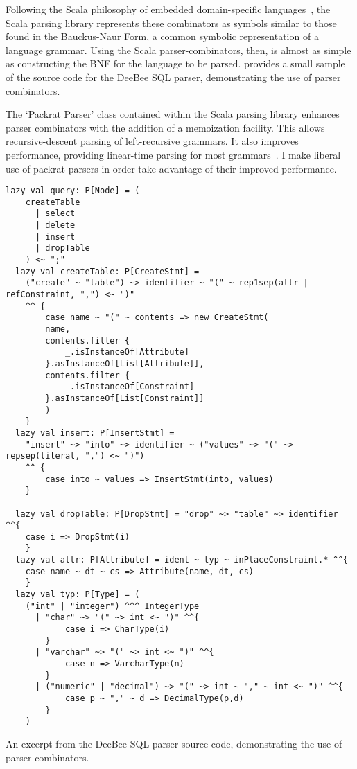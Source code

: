 Following the Scala philosophy of embedded domain-specific languages~\cite{ghosh2010dsls,hofer2008polymorphic,moors2008parser}, the Scala parsing library represents these combinators as symbols similar to those found in the Bauckus-Naur Form, a common symbolic representation of a language grammar. Using the Scala parser-combinators, then, is almost as simple as constructing the BNF for the language to be parsed.  provides a small sample of the source code for the DeeBee SQL parser, demonstrating the use of parser combinators. 

The `Packrat Parser' class contained within the Scala parsing library enhances parser combinators with the addition of a memoization facility. This allows recursive-descent parsing of left-recursive grammars. It also improves performance, providing linear-time parsing for most grammars~\cite{jonnalagedda2009packrat}. I make liberal use of packrat parsers in order take advantage of their improved performance.

\begin{listing}[H]
    \begin{verbatim}
lazy val query: P[Node] = (
    createTable
      | select
      | delete
      | insert
      | dropTable
    ) <~ ";"
  lazy val createTable: P[CreateStmt] = 
    ("create" ~ "table") ~> identifier ~ "(" ~ rep1sep(attr | refConstraint, ",") <~ ")" 
    ^^ {
        case name ~ "(" ~ contents => new CreateStmt(
        name,
        contents.filter {
            _.isInstanceOf[Attribute]
        }.asInstanceOf[List[Attribute]],
        contents.filter {
            _.isInstanceOf[Constraint]
        }.asInstanceOf[List[Constraint]]
        )
    }
  lazy val insert: P[InsertStmt] = 
    "insert" ~> "into" ~> identifier ~ ("values" ~> "(" ~> repsep(literal, ",") <~ ")") 
    ^^ {
        case into ~ values => InsertStmt(into, values)
    }

  lazy val dropTable: P[DropStmt] = "drop" ~> "table" ~> identifier ^^{ 
    case i => DropStmt(i) 
    }
  lazy val attr: P[Attribute] = ident ~ typ ~ inPlaceConstraint.* ^^{ 
    case name ~ dt ~ cs => Attribute(name, dt, cs)
    }
  lazy val typ: P[Type] = (
    ("int" | "integer") ^^^ IntegerType
      | "char" ~> "(" ~> int <~ ")" ^^{ 
            case i => CharType(i) 
        }
      | "varchar" ~> "(" ~> int <~ ")" ^^{ 
            case n => VarcharType(n) 
        }
      | ("numeric" | "decimal") ~> "(" ~> int ~ "," ~ int <~ ")" ^^{ 
            case p ~ "," ~ d => DecimalType(p,d)
        }
    )
    \end{verbatim}
    \caption{An excerpt from the DeeBee SQL parser source code, demonstrating the use of parser-combinators.}
    \label{lst:parsing}
\end{listing}

